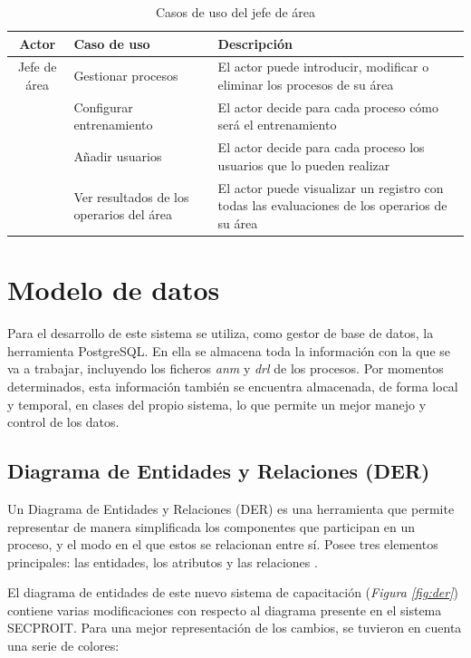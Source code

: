 \begin{table}[H]
\begin{center}
\begin{tabular}{ | c | p{3.5cm} |  p{7.5cm} |}
\hline
\textbf{Actor} & \textbf{Caso de uso} & \textbf{Descripción}\\
\hline
Jefe de área & Gestionar procesos & El actor puede introducir, modificar o eliminar los procesos de su área \\
\cline{2-3}
& Configurar entrenamiento & El actor decide para cada proceso cómo será el entrenamiento \\
\cline{2-3}
& Añadir usuarios & El actor decide para cada proceso los usuarios que lo pueden realizar \\
\cline{2-3}
& Ver resultados de los operarios del área & El actor puede visualizar un registro con todas las evaluaciones de los operarios de su área \\
\hline
\end{tabular}
\caption{Casos de uso del jefe de área}
\end{center}
\end{table}

\section{Modelo de datos}
Para el desarrollo de este sistema se utiliza, como gestor de base de datos, la herramienta PostgreSQL. En ella se almacena toda la información con la que se va a trabajar, incluyendo los ficheros \textsl{anm} y \textsl{drl} de los procesos. Por momentos determinados, esta información también se encuentra almacenada, de forma local y temporal, en clases del propio sistema, lo que permite un mejor manejo y control de los datos.

\subsection{Diagrama de Entidades y Relaciones (DER)}
Un Diagrama de Entidades y Relaciones (DER) es una herramienta que permite representar de manera simplificada los componentes que participan en un proceso, y el modo en el que estos se relacionan entre sí. Posee tres elementos principales: las entidades, los atributos y las relaciones \cite{Li2009}.

El diagrama de entidades de este nuevo sistema de capacitación (\textsl{Figura \ref{fig:der}}) contiene varias modificaciones con respecto al diagrama presente en el sistema SECPROIT. Para una mejor representación de los cambios, se tuvieron en cuenta una serie de colores:

